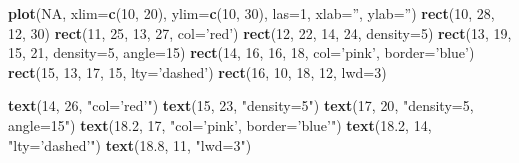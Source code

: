 \documentclass[10pt,]{krantz}
\makeatletter
\newenvironment{Shaded}{\begin{snugshade}}{\end{snugshade}}
\newcommand{\KeywordTok}[1]{\textcolor[rgb]{0.13,0.29,0.53}{\textbf{#1}}}
\newcommand{\DataTypeTok}[1]{\textcolor[rgb]{0.13,0.29,0.53}{#1}}
\newcommand{\DecValTok}[1]{\textcolor[rgb]{0.00,0.00,0.81}{#1}}
\newcommand{\FloatTok}[1]{\textcolor[rgb]{0.00,0.00,0.81}{#1}}
\newcommand{\StringTok}[1]{\textcolor[rgb]{0.31,0.60,0.02}{#1}}
\newcommand{\OtherTok}[1]{\textcolor[rgb]{0.56,0.35,0.01}{#1}}
\newcommand{\NormalTok}[1]{#1}
\newenvironment{kframe}{%
\medskip{}
\setlength{\fboxsep}{.8em}
 \def\at@end@of@kframe{}%
 \ifinner\ifhmode%
  \def\at@end@of@kframe{\end{minipage}}%
  \begin{minipage}{\columnwidth}%
 \fi\fi%
 \def\FrameCommand##1{\hskip\@totalleftmargin \hskip-\fboxsep
 \colorbox{shadecolor}{##1}\hskip-\fboxsep
     \hskip-\linewidth \hskip-\@totalleftmargin \hskip\columnwidth}%
 \MakeFramed {\advance\hsize-\width
   \@totalleftmargin\z@ \linewidth\hsize
   \@setminipage}}%
 {\par\unskip\endMakeFramed%
 \at@end@of@kframe}
\renewenvironment{Shaded}{\begin{kframe}}{\end{kframe}}
\makeatother
\begin{document}
\begin{Shaded}
\begin{Highlighting}[]
\KeywordTok{plot}\NormalTok{(}\OtherTok{NA}\NormalTok{, }\DataTypeTok{xlim=}\KeywordTok{c}\NormalTok{(}\DecValTok{10}\NormalTok{, }\DecValTok{20}\NormalTok{), }\DataTypeTok{ylim=}\KeywordTok{c}\NormalTok{(}\DecValTok{10}\NormalTok{, }\DecValTok{30}\NormalTok{), }\DataTypeTok{las=}\DecValTok{1}\NormalTok{, }\DataTypeTok{xlab=}\StringTok{''}\NormalTok{, }\DataTypeTok{ylab=}\StringTok{''}\NormalTok{)}
\KeywordTok{rect}\NormalTok{(}\DecValTok{10}\NormalTok{, }\DecValTok{28}\NormalTok{, }\DecValTok{12}\NormalTok{, }\DecValTok{30}\NormalTok{)}
\KeywordTok{rect}\NormalTok{(}\DecValTok{11}\NormalTok{, }\DecValTok{25}\NormalTok{, }\DecValTok{13}\NormalTok{, }\DecValTok{27}\NormalTok{, }\DataTypeTok{col=}\StringTok{'red'}\NormalTok{)}
\KeywordTok{rect}\NormalTok{(}\DecValTok{12}\NormalTok{, }\DecValTok{22}\NormalTok{, }\DecValTok{14}\NormalTok{, }\DecValTok{24}\NormalTok{, }\DataTypeTok{density=}\DecValTok{5}\NormalTok{)}
\KeywordTok{rect}\NormalTok{(}\DecValTok{13}\NormalTok{, }\DecValTok{19}\NormalTok{, }\DecValTok{15}\NormalTok{, }\DecValTok{21}\NormalTok{, }\DataTypeTok{density=}\DecValTok{5}\NormalTok{, }\DataTypeTok{angle=}\DecValTok{15}\NormalTok{)}
\KeywordTok{rect}\NormalTok{(}\DecValTok{14}\NormalTok{, }\DecValTok{16}\NormalTok{, }\DecValTok{16}\NormalTok{, }\DecValTok{18}\NormalTok{, }\DataTypeTok{col=}\StringTok{'pink'}\NormalTok{, }\DataTypeTok{border=}\StringTok{'blue'}\NormalTok{)}
\KeywordTok{rect}\NormalTok{(}\DecValTok{15}\NormalTok{, }\DecValTok{13}\NormalTok{, }\DecValTok{17}\NormalTok{, }\DecValTok{15}\NormalTok{, }\DataTypeTok{lty=}\StringTok{'dashed'}\NormalTok{)}
\KeywordTok{rect}\NormalTok{(}\DecValTok{16}\NormalTok{, }\DecValTok{10}\NormalTok{, }\DecValTok{18}\NormalTok{, }\DecValTok{12}\NormalTok{, }\DataTypeTok{lwd=}\DecValTok{3}\NormalTok{)}

\KeywordTok{text}\NormalTok{(}\DecValTok{14}\NormalTok{, }\DecValTok{26}\NormalTok{, }\StringTok{"col='red'"}\NormalTok{)}
\KeywordTok{text}\NormalTok{(}\DecValTok{15}\NormalTok{, }\DecValTok{23}\NormalTok{, }\StringTok{"density=5"}\NormalTok{)}
\KeywordTok{text}\NormalTok{(}\DecValTok{17}\NormalTok{, }\DecValTok{20}\NormalTok{, }\StringTok{"density=5, angle=15"}\NormalTok{)}
\KeywordTok{text}\NormalTok{(}\FloatTok{18.2}\NormalTok{, }\DecValTok{17}\NormalTok{, }\StringTok{"col='pink', border='blue'"}\NormalTok{)}
\KeywordTok{text}\NormalTok{(}\FloatTok{18.2}\NormalTok{, }\DecValTok{14}\NormalTok{, }\StringTok{"lty='dashed'"}\NormalTok{)}
\KeywordTok{text}\NormalTok{(}\FloatTok{18.8}\NormalTok{, }\DecValTok{11}\NormalTok{, }\StringTok{"lwd=3"}\NormalTok{)}
\end{Highlighting}
\end{Shaded}
\end{document}
